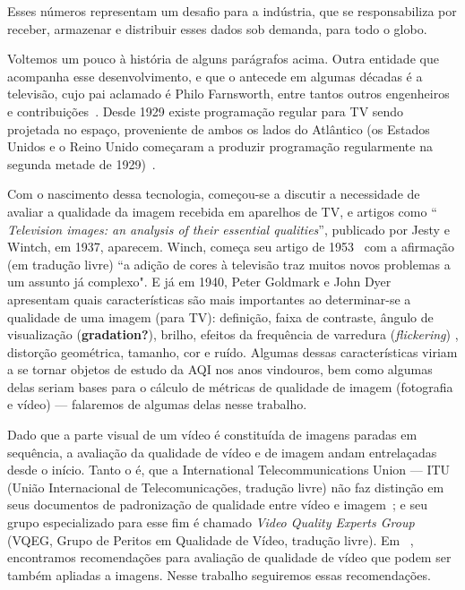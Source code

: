 	Esses números representam um desafio para a indústria, que se responsabiliza por receber, armazenar e distribuir esses dados sob demanda, para todo o globo.

	Voltemos um pouco à história de alguns parágrafos acima. Outra entidade que acompanha esse desenvolvimento, e que o antecede em algumas décadas é a televisão, cujo pai aclamado é Philo Farnsworth, entre tantos outros engenheiros e contribuições~\cite{tvhist}. Desde 1929 existe programação regular para TV sendo projetada no espaço, proveniente de ambos os lados do Atlântico (os Estados Unidos e o Reino Unido começaram a produzir programação regularmente na segunda metade de 1929)~\cite{tvhist}. 

	Com o nascimento dessa tecnologia, começou-se a discutir a necessidade de avaliar a qualidade da imagem recebida em aparelhos de TV, e artigos como ``\emph{ Television images: an analysis of their essential qualities}'', publicado por Jesty e Wintch, em 1937\cite{Jesty1937}, aparecem. Winch, começa seu artigo de 1953~\cite{Winch1953} com a afirmação (em tradução livre) ``a adição de cores à televisão traz muitos novos problemas a um assunto já complexo". E já em 1940, Peter Goldmark e John Dyer ~\cite{Goldmark1940} apresentam quais características são mais importantes ao determinar-se a qualidade de uma imagem (para TV): definição, faixa de contraste, ângulo de visualização (\textbf{gradation?}), brilho, efeitos da frequência de varredura (\emph{flickering}) , distorção geométrica, tamanho, cor e ruído. Algumas dessas características viriam a se tornar objetos de estudo da AQI nos anos vindouros, bem como algumas delas seriam bases para o cálculo de métricas de qualidade de imagem (fotografia e vídeo) --- falaremos de algumas delas nesse trabalho.

	Dado que a parte visual de um vídeo é constituída de imagens paradas em sequência, a avaliação da qualidade de vídeo e de imagem andam entrelaçadas desde o início. Tanto o é, que a International Telecommunications Union --- ITU (União Internacional de Telecomunicações, tradução livre) não faz distinção em seus documentos de padronização de qualidade entre vídeo e imagem~\cite{itut2004}; e seu grupo especializado para esse fim é chamado \emph{Video Quality Experts Group} (VQEG, Grupo de Peritos em Qualidade de Vídeo, tradução livre). Em ~\cite{itut2004}, encontramos recomendações para avaliação de qualidade de vídeo que podem ser também apliadas a imagens. Nesse trabalho seguiremos essas recomendações.

